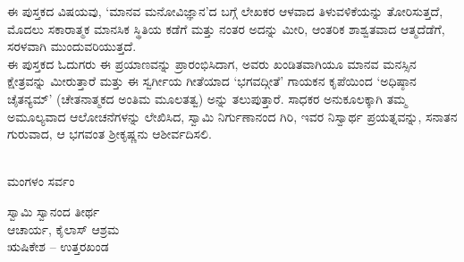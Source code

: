 {ಈ ಪುಸ್ತಕದ ವಿಷಯವು, ‘ಮಾನವ ಮನೋವಿಜ್ಞಾನ’ದ ಬಗ್ಗೆ ಲೇಖಕರ ಆಳವಾದ ತಿಳುವಳಿಕೆಯನ್ನು ತೋರಿಸುತ್ತದೆ, ಮೊದಲು ಸಕಾರಾತ್ಮಕ ಮಾನಸಿಕ ಸ್ಥಿತಿಯ ಕಡೆಗೆ ಮತ್ತು ನಂತರ ಅದನ್ನು ಮೀರಿ, ಆಂತರಿಕ ಶಾಶ್ವತವಾದ ಆತ್ಮದೆಡೆಗೆ, ಸರಳವಾಗಿ ಮುಂದುವರಿಯುತ್ತದೆ. \\
ಈ ಪುಸ್ತಕದ ಓದುಗರು ಈ ಪ್ರಯಾಣವನ್ನು ಪ್ರಾರಂಭಿಸಿದಾಗ, ಅವರು ಖಂಡಿತವಾಗಿಯೂ ಮಾನವ ಮನಸ್ಸಿನ ಕ್ಷೇತ್ರವನ್ನು ಮೀರುತ್ತಾರೆ ಮತ್ತು ಈ ಸ್ವರ್ಗೀಯ ಗೀತೆಯಾದ  ‘ಭಗವದ್ಗೀತೆ’ ಗಾಯಕನ ಕೃಪೆಯಿಂದ ‘ಅಧಿಷ್ಠಾನ ಚೈತನ್ಯಮ್’ (ಚೇತನಾತ್ಮಕದ ಅಂತಿಮ ಮೂಲತತ್ವ) ಅನ್ನು ತಲುಪುತ್ತಾರೆ. ಸಾಧಕರ ಅನುಕೂಲಕ್ಕಾಗಿ ತಮ್ಮ ಅಮೂಲ್ಯವಾದ ಆಲೋಚನೆಗಳನ್ನು ಲೇಖಿಸಿದ, ಸ್ವಾಮಿ ನಿರ್ಗುಣಾನಂದ ಗಿರಿ, ಇವರ ನಿಸ್ವಾರ್ಥ ಪ್ರಯತ್ನವನ್ನು,  ಸನಾತನ ಗುರುವಾದ, ಆ ಭಗವಂತ ಶ್ರೀಕೃಷ್ಣನು ಆಶೀರ್ವದಿಸಲಿ.\\\\
\begin{center}
ಮಂಗಳಂ ಸರ್ವಂ
\end{center}

{\kanBold ಸ್ವಾಮಿ ಸ್ವಾನಂದ ತೀರ್ಥ} \\
ಆಚಾರ್ಯ, ಕೈಲಾಸ್ ಆಶ್ರಮ\\
ಋಷಿಕೇಶ – ಉತ್ತರಖಂಡ\\
}